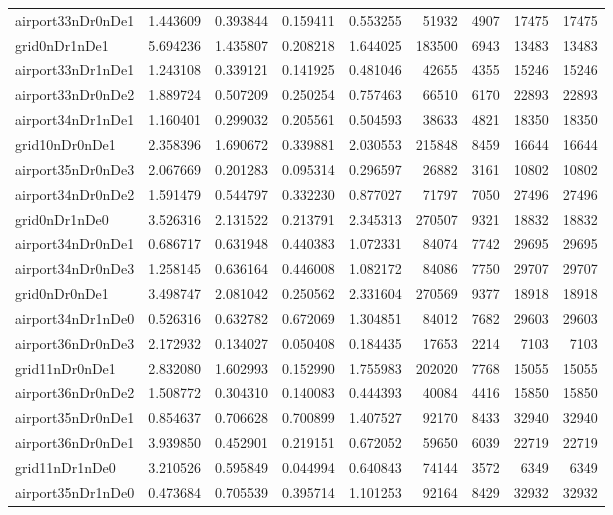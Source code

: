 \documentclass[../../../thesis.tex]{subfiles}
\begin{document}
\begin{longtable}{|l|r|r|r|r|r|r|r|r|}
airport33nDr0nDe1 & 1.443609 & 0.393844 & 0.159411 & 0.553255 & 51932 & 4907 & 17475 & 17475 \\
grid0nDr1nDe1 & 5.694236 & 1.435807 & 0.208218 & 1.644025 & 183500 & 6943 & 13483 & 13483 \\
airport33nDr1nDe1 & 1.243108 & 0.339121 & 0.141925 & 0.481046 & 42655 & 4355 & 15246 & 15246 \\
airport33nDr0nDe2 & 1.889724 & 0.507209 & 0.250254 & 0.757463 & 66510 & 6170 & 22893 & 22893 \\
airport34nDr1nDe1 & 1.160401 & 0.299032 & 0.205561 & 0.504593 & 38633 & 4821 & 18350 & 18350 \\
grid10nDr0nDe1 & 2.358396 & 1.690672 & 0.339881 & 2.030553 & 215848 & 8459 & 16644 & 16644 \\
airport35nDr0nDe3 & 2.067669 & 0.201283 & 0.095314 & 0.296597 & 26882 & 3161 & 10802 & 10802 \\
airport34nDr0nDe2 & 1.591479 & 0.544797 & 0.332230 & 0.877027 & 71797 & 7050 & 27496 & 27496 \\
grid0nDr1nDe0 & 3.526316 & 2.131522 & 0.213791 & 2.345313 & 270507 & 9321 & 18832 & 18832 \\
airport34nDr0nDe1 & 0.686717 & 0.631948 & 0.440383 & 1.072331 & 84074 & 7742 & 29695 & 29695 \\
airport34nDr0nDe3 & 1.258145 & 0.636164 & 0.446008 & 1.082172 & 84086 & 7750 & 29707 & 29707 \\
grid0nDr0nDe1 & 3.498747 & 2.081042 & 0.250562 & 2.331604 & 270569 & 9377 & 18918 & 18918 \\
airport34nDr1nDe0 & 0.526316 & 0.632782 & 0.672069 & 1.304851 & 84012 & 7682 & 29603 & 29603 \\
airport36nDr0nDe3 & 2.172932 & 0.134027 & 0.050408 & 0.184435 & 17653 & 2214 & 7103 & 7103 \\
grid11nDr0nDe1 & 2.832080 & 1.602993 & 0.152990 & 1.755983 & 202020 & 7768 & 15055 & 15055 \\
airport36nDr0nDe2 & 1.508772 & 0.304310 & 0.140083 & 0.444393 & 40084 & 4416 & 15850 & 15850 \\
airport35nDr0nDe1 & 0.854637 & 0.706628 & 0.700899 & 1.407527 & 92170 & 8433 & 32940 & 32940 \\
airport36nDr0nDe1 & 3.939850 & 0.452901 & 0.219151 & 0.672052 & 59650 & 6039 & 22719 & 22719 \\
grid11nDr1nDe0 & 3.210526 & 0.595849 & 0.044994 & 0.640843 & 74144 & 3572 & 6349 & 6349 \\
airport35nDr1nDe0 & 0.473684 & 0.705539 & 0.395714 & 1.101253 & 92164 & 8429 & 32932 & 32932 \\

\end{longtable}
\end{document}
